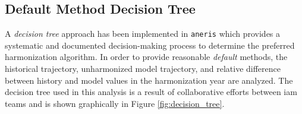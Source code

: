 \documentclass[review]{elsarticle}
\newcommand{\codeb}[1]{\texttt{#1}}
\begin{document}
\subsection{Default Method Decision Tree}\label{sec:tree}

A \textit{decision tree} approach has been implemented in \codeb{aneris} which
provides a systematic and documented decision-making process to determine the
preferred harmonization algorithm. In order to provide reasonable
\textit{default} methods, the historical trajectory, unharmonized model
trajectory, and relative difference between history and model values in the
harmonization year are analyzed. The decision tree used in this analysis is a
result of collaborative efforts between \gls{iam} teams and is shown graphically in
Figure \ref{fig:decision_tree}.
\end{document}
